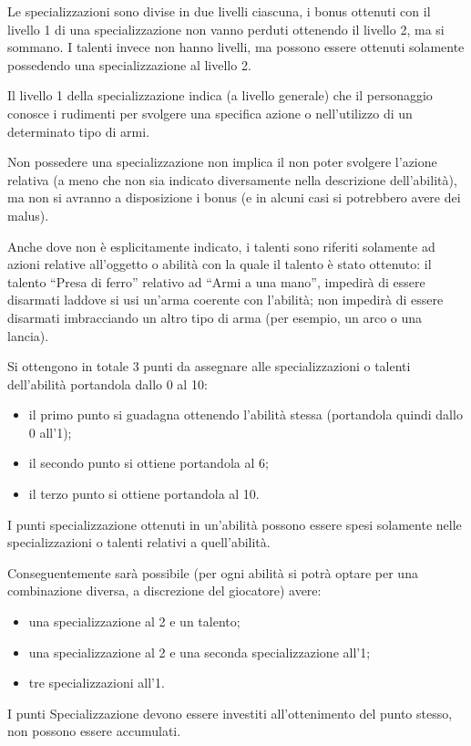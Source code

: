 \documentclass[../manuale_main.tex]{subfiles}
\begin{document}
Le specializzazioni sono divise in due livelli ciascuna, i bonus ottenuti con il livello 1 di una specializzazione non vanno perduti ottenendo il livello 2, ma si sommano.
I talenti invece non hanno livelli, ma possono essere ottenuti solamente possedendo una specializzazione al livello 2.

Il livello 1 della specializzazione indica (a livello generale) che il personaggio conosce i rudimenti per svolgere una specifica azione o nell'utilizzo di un determinato tipo di armi.

Non possedere una specializzazione non implica il non poter svolgere l'azione relativa (a meno che non sia indicato diversamente nella descrizione dell'abilità), ma non si avranno a disposizione i bonus (e in alcuni casi si potrebbero avere dei malus).

Anche dove non è esplicitamente indicato, i talenti sono riferiti solamente ad azioni relative all'oggetto o abilità con la quale il talento è stato ottenuto: il talento ``Presa di ferro” relativo ad ``Armi a una mano”, impedirà di essere disarmati laddove si usi un'arma coerente con l'abilità; non impedirà di essere disarmati imbracciando un altro tipo di arma (per esempio, un arco o una lancia).

Si ottengono in totale 3 punti da assegnare alle specializzazioni o talenti dell'abilità portandola dallo 0 al 10:
\begin{itemize}
\item il primo punto si guadagna ottenendo l'abilità stessa (portandola quindi dallo 0 all'1);
\item il secondo punto si ottiene portandola al 6;
\item il terzo punto si ottiene portandola al 10.
\end{itemize}
I punti specializzazione ottenuti in un'abilità possono essere spesi solamente nelle specializzazioni o talenti relativi a quell'abilità.

Conseguentemente sarà possibile (per ogni abilità si potrà optare per una combinazione diversa, a discrezione del giocatore) avere:
\begin{itemize}
\item una specializzazione al 2 e un talento;
\item una specializzazione al 2 e una seconda specializzazione all'1;
\item tre specializzazioni all'1.
\end{itemize}
I punti Specializzazione devono essere investiti all'ottenimento del punto stesso, non possono essere accumulati.
\end{document}
